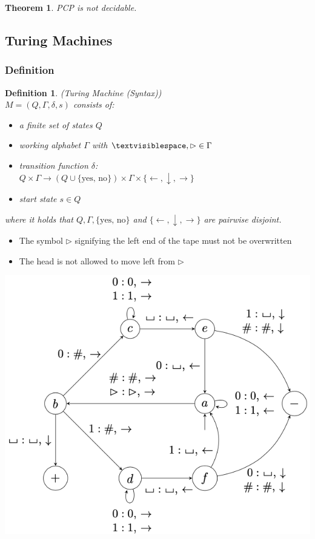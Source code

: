 \documentclass[a3paper, 8pt]{extarticle}
\newtheorem{theorem}{Theorem}[section]
\newtheorem*{definition}{Definition}
\begin{document}
\begin{multicols*}{6}
\begin{theorem}
PCP is not decidable.
\end{theorem}

\subsection{Turing Machines}
\subsubsection{Definition}
\begin{definition}
    (Turing Machine (Syntax))\\ $M=(Q,\Gamma, \delta, s)$ consists of:
    \begin{itemize}
        \item a finite set of states $Q$
        \item working alphabet $\Gamma$ with $\textvisiblespace, \rhd \in \Gamma$
        \item transition function $\delta$: \\ $Q \times \Gamma \to (Q \cup \{\text{yes, no}\}) \times \Gamma \times \{\leftarrow, \downarrow, \rightarrow\}$
        \item start state $s \in Q$
\end{itemize}
where it holds that $Q, \Gamma, \{\text{yes, no}\}$ and $\{ \leftarrow, \downarrow, \rightarrow\}$ are pairwise disjoint.
\end{definition}

\begin{itemize}
    \item  The symbol $\rhd$ signifying the left end of the tape must not be overwritten
    \item The head is not allowed to move left from $\rhd$
\end{itemize}

\includegraphics[width=\columnwidth]{images/Screen Shot 2022-12-26 at 17.14.00.png}

\end{multicols*}
\end{document}
